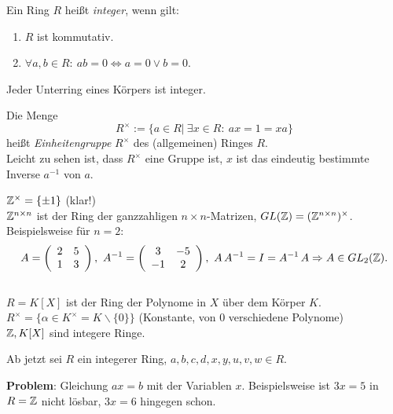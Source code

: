 \documentclass[a4paper,twoside,DIV15,BCOR12mm]{scrbook}
\begin{document}
\begin{definition}
Ein Ring $R$ heißt \emph{integer}, wenn gilt:
\begin{enumerate}
\item $R$ ist kommutativ.
\item $\forall a,b \in R:\ ab=0 \iff a=0 \vee b=0$.
\end{enumerate}
\end{definition}
\begin{beispiel}
    Jeder Unterring eines Körpers ist integer.
\end{beispiel}
\begin{definition}
    Die Menge
    $$
    R^{\times}:=\{a \in R|\ \exists x \in R:\ ax=1=xa\}
    $$
    heißt \emph{Einheitengruppe} $R^{\times}$ des (allgemeinen)
    Ringes $R$.\\
    Leicht zu sehen ist, dass $R^{\times}$ eine Gruppe ist, $x$ ist
    das eindeutig bestimmte Inverse $a^{-1}$ von $a$.
\end{definition}
\begin{beispiel}
    $\mathbb{Z}^{\times}=\{\pm 1\}$ (klar!)\\
    $\mathbb{Z}^{n \times n}$ ist der Ring der ganzzahligen $n\times
    n$-Matrizen, $GL(\mathbb{Z})=(\mathbb{Z}^{n \times n})^{\times}$.
    Beispielsweise für $n=2$:\\
    $$
    A=\left(
        \begin{array}{cc}
          2 & 5 \\
          1 & 3 \\
        \end{array}
      \right),\ A^{-1}=\left(
        \begin{array}{cc}
          3 & -5 \\
          -1 & 2 \\
        \end{array}
      \right),\ A\,A^{-1}=I=A^{-1}\,A \Rightarrow A \in GL_2(\mathbb{Z}).
    $$\\
    $R=K[X]$ ist der Ring der Polynome in $X$ über dem Körper $K$.
    $R^{\times}=\{\alpha \in K^{\times}=K\backslash \{0\}\}$ (Konstante,
    von $0$ verschiedene Polynome)\\
    $\mathbb{Z}, K[X]$ sind integere Ringe.
\end{beispiel}
Ab jetzt sei $R$ ein integerer Ring, $a,b,c,d,x,y,u,v,w \in R$.

\textbf{Problem}: Gleichung $ax=b$ mit der Variablen $x$.
Beispielsweise ist $3x=5$ in $R=\mathbb{Z}$ nicht lösbar, $3x=6$ hingegen
schon.
\end{document}
